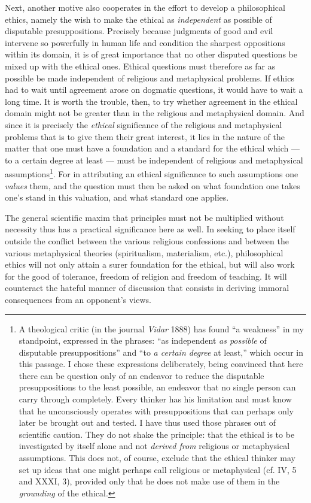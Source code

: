 \documentclass[12pt,a4paper,openany]{book}
\newcommand{\opage}[1]{\marginnote{\footnotesize\textit{[#1]}}}
\begin{document}
Next, another motive also cooperates in the effort to develop a philosophical ethics, namely the
wish to make the ethical as \textit{independent} as possible of disputable presuppositions. Precisely
because judgments of good and evil intervene so powerfully in human life and condition the sharpest
oppositions within its domain, it is of great importance that no other disputed questions be mixed
up with the ethical ones. Ethical questions must therefore as far as possible be made independent of
religious and metaphysical problems. If ethics had to wait until agreement arose on dogmatic
questions, it would have to wait a long time. It is worth the trouble, then, to try whether agreement
in the ethical domain might not be greater than in the religious and metaphysical domain. And since
it is precisely the \textit{ethical} significance of the religious and metaphysical problems that is
to give them their great interest, it lies in the nature of
\opage{19}the matter that one must have a foundation and a standard for the ethical which --- to a certain
degree at least --- must be independent of religious and metaphysical
assumptions\footnote[1]{A theological critic (in the journal \textit{Vidar} 1888) has found ``a
weakness'' in my standpoint, expressed in the phrases: ``as independent \textit{as possible} of
disputable presuppositions'' and ``to \textit{a certain degree} at least,'' which occur in this
passage. I chose these expressions deliberately, being convinced that here there can be question
only of an endeavor to reduce the disputable presuppositions to the least possible, an endeavor that
no single person can carry through completely. Every thinker has his limitation and must know that
he unconsciously operates with presuppositions that can perhaps only later be brought out and
tested. I have thus used those phrases out of scientific caution. They do not shake the principle:
that the ethical is to be investigated by itself alone and not \textit{derived from} religious or
metaphysical assumptions. This does not, of course, exclude that the ethical thinker may set up ideas
that one might perhaps call religious or metaphysical (cf. IV, 5 and XXXI, 3), provided only that he
does not make use of them in the \textit{grounding} of the ethical.}. For in attributing an ethical
significance to such assumptions one \textit{values} them, and the question must then be asked on
what foundation one takes one's stand in this valuation, and what standard one applies.

The general scientific maxim that principles must not be multiplied without necessity thus has a
practical significance here as well. In seeking to place itself outside the conflict between the
various religious confessions and between the various metaphysical theories (spiritualism,
materialism, etc.), philosophical ethics will not only attain a surer foundation for the ethical,
but will also work for the good of tolerance, freedom of religion and freedom of teaching. It will
counteract the hateful manner of discussion that consists in deriving immoral consequences from an
opponent's views.
\end{document}
